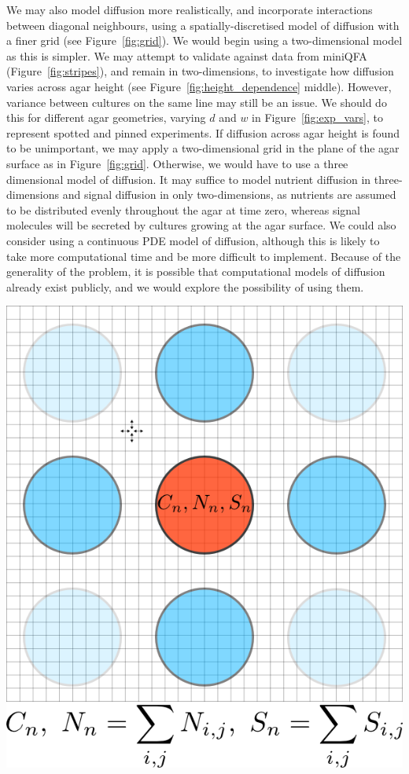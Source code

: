 We may also model diffusion more realistically, and incorporate
interactions between diagonal neighbours, using a
spatially-discretised model of diffusion with a finer grid (see
Figure~\ref{fig:grid}). We would begin using a two-dimensional model
as this is simpler. We may attempt to validate against data from
miniQFA (Figure~\ref{fig:stripes}), and remain in two-dimensions, to
investigate how diffusion varies across agar height (see
Figure~\ref{fig:height_dependence} middle). However, variance between
cultures on the same line may still be an issue. We should do this for
different agar geometries, varying \(d\) and \(w\) in
Figure~\ref{fig:exp_vars}, to represent spotted and pinned
experiments. If diffusion across agar height is found to be
unimportant, we may apply a two-dimensional grid in the plane of the
agar surface as in Figure~\ref{fig:grid}. Otherwise, we would have to
use a three dimensional model of diffusion. It may suffice to model
nutrient diffusion in three-dimensions and signal diffusion in only
two-dimensions, as nutrients are assumed to be distributed evenly
throughout the agar at time zero, whereas signal molecules will be
secreted by cultures growing at the agar surface. We could also
consider using a continuous PDE model of diffusion, although this is
likely to take more computational time and be more difficult to
implement. Because of the generality of the problem, it is possible
that computational models of diffusion already exist publicly, and we
would explore the possibility of using them.


\begin{Figure}
  \centering
  \includegraphics[width=\linewidth]{square_array_grid}
  \label{fig:grid}
\end{Figure}

